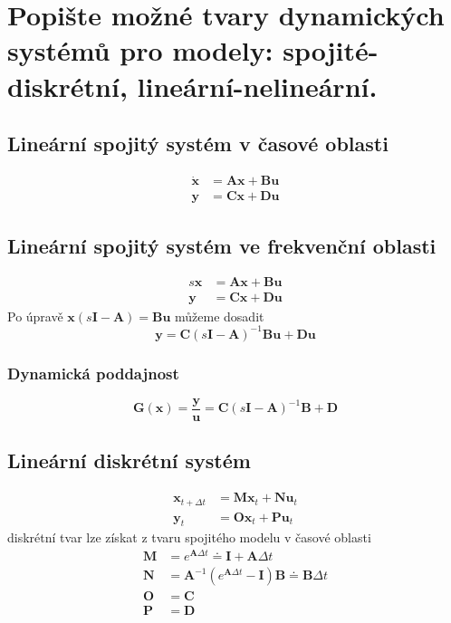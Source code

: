 \documentclass{article}
\begin{document}
	\section{Popište možné tvary dynamických systémů pro modely: spojité-diskrétní, lineární-nelineární. }
	
	\subsection*{Lineární spojitý systém v časové oblasti}
	\begin{align*}
		\bm{\dot{x}} &= \bm{A}\bm{x} + \bm{B}\bm{u} \\
		\bm{y} &= \bm{C}\bm{x} + \bm{D}\bm{u}
	\end{align*}
	\subsection*{Lineární spojitý systém ve frekvenční oblasti}
	\begin{align*}
		s\bm{x} &= \bm{A}\bm{x} + \bm{B}\bm{u} \\
		\bm{y} &= \bm{C}\bm{x} + \bm{D}\bm{u}
	\end{align*}
	Po úpravě $\bm{x}(s\bm{I} - \bm{A}) = \bm{B}\bm{u}$ můžeme dosadit
	\begin{equation}
		\bm{y} = \bm{C}(s\bm{I}-\bm{A})^{-1}\bm{B}\bm{u}+\bm{D}\bm{u}
	\end{equation}
	\subsubsection*{Dynamická poddajnost}
	\begin{equation}
	\bm{G}(\bm{x}) = \frac{\bm{y}}{\bm{u}} = \bm{C}(s\bm{I}-\bm{A})^{-1}\bm{B}+\bm{D}
	\end{equation}
	\subsection*{Lineární diskrétní systém}
	\begin{align*}
		\bm{x}_{t+\Delta t} &= \bm{M}\bm{x}_t + \bm{N}\bm{u}_t \\
		\bm{y}_t &= \bm{O}\bm{x}_t + \bm{P}\bm{u}_t
	\end{align*}
	diskrétní tvar lze získat z tvaru spojitého modelu v časové oblasti
	\begin{align*}
		\bm{M} &= e^{\bm{A}\Delta t} \doteq \bm{I} + \bm{A}\Delta t
		\\
		\bm{N} &= \bm{A}^{-1} \left( e^{\mathbf{A}\Delta t} - \mathbf{I} \right) \bm{B} \doteq \bm{B}\Delta t
		\\
		\bm{O} &= \bm{C}
		\\
		\bm{P} &= \bm{D}
	\end{align*}
\end{document}
